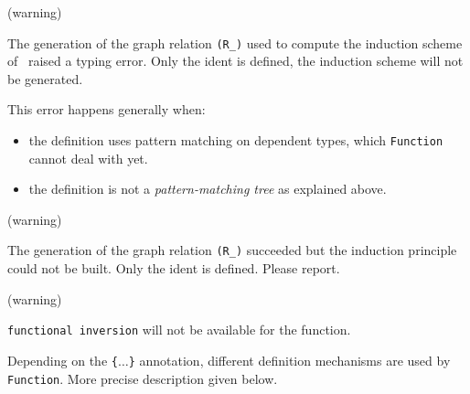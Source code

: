 \begin{ErrMsgs}
\item {}
\item {}
\item {}

\item {} (warning)

  The generation of the graph relation \texttt{(R\_\ident)} used to
  compute the induction scheme of \ident\ raised a typing error. Only
  the ident is defined, the induction scheme will not be generated.

  This error happens generally when:

  \begin{itemize}
  \item the definition uses pattern matching on dependent types, which
    \texttt{Function} cannot deal with yet.
  \item the definition is not a \emph{pattern-matching tree} as
    explained above.
  \end{itemize}

\item {} (warning)

  The generation of the graph relation \texttt{(R\_\ident)} succeeded
  but the induction principle could not be built. Only the ident is
  defined. Please report.

\item {} (warning)

  \texttt{functional inversion} will not be available for the
  function.
\end{ErrMsgs}


\SeeAlso{\ref{FunScheme}, \ref{FunScheme-examples}, \ref{FunInduction}}

Depending on the {\tt \{$\ldots$\}} annotation, different definition
mechanisms are used by {\tt Function}. More precise description
given below.

